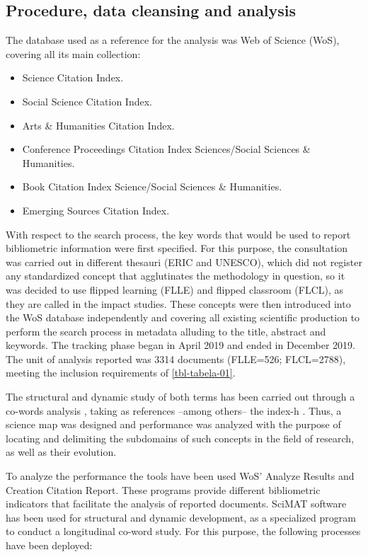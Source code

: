 \documentclass{textolivre-html}
\begin{document}
\subsection{Procedure, data cleansing and analysis}\label{sec-procedure}
The database used as a reference for the analysis was Web of Science (WoS), covering all its main collection:

\begin{itemize}
    \item Science Citation Index.
    \item Social Science Citation Index.
    \item Arts \& Humanities Citation Index.
    \item Conference Proceedings Citation Index Sciences/Social Sciences \& Humanities.
    \item Book Citation Index Science/Social Sciences \& Humanities.
    \item Emerging Sources Citation Index.
\end{itemize}

With respect to the search process, the key words that would be used to report bibliometric information were first specified. For this purpose, the consultation was carried out in different thesauri (ERIC and UNESCO), which did not register any standardized concept that agglutinates the methodology in question, so it was decided to use flipped learning (FLLE) and flipped classroom (FLCL), as they are called in the impact studies. These concepts were then introduced into the WoS database independently and covering all existing scientific production to perform the search process in metadata alluding to the title, abstract and keywords. The tracking phase began in April 2019 and ended in December 2019. The unit of analysis reported was 3314 documents (FLLE=526; FLCL=2788), meeting the inclusion requirements of \cref{tbl-tabela-01}.

The structural and dynamic study of both terms has been carried out through a co-words analysis \cite{hirsch_index_2005}, taking as references –among others– the index-h \cite{cobo_science_2011}. Thus, a science map was designed and performance was analyzed with the purpose of locating and delimiting the subdomains of such concepts in the field of research, as well as their evolution.

To analyze the performance the tools have been used WoS' Analyze Results and Creation Citation Report. These programs provide different bibliometric indicators that facilitate the analysis of reported documents. SciMAT software has been used for structural and dynamic development, as a specialized program to conduct a longitudinal co-word study. For this purpose, the following processes have been deployed:
\end{document}
